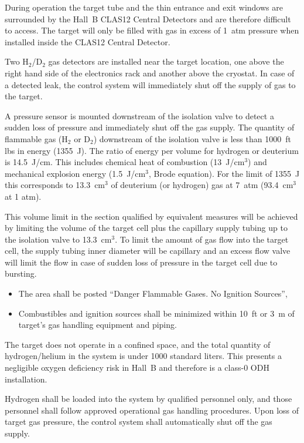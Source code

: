 During operation the target tube and the thin entrance and exit windows are surrounded by the Hall~B CLAS12
Central Detectors and are therefore difficult to access. The target will only be filled with gas in excess
of 1~atm pressure when installed inside the CLAS12 Central Detector.

Two H$_2$/D$_2$ gas detectors are installed near the target location, one above the right hand side of the
electronics rack and another above the cryostat. In case of a detected leak, the control system will
immediately shut off the supply of gas to the target.

A pressure sensor is mounted downstream of the isolation valve to detect a sudden loss of pressure and
immediately shut off the gas supply. The quantity of flammable gas (H$_2$ or D$_2$) downstream of the
isolation valve is less than 1000~ft lbs in energy (1355~J). The ratio of energy per volume for hydrogen
or deuterium is 14.5~J/cm. This includes chemical heat of combustion (13~J/cm$^3$) and mechanical explosion
energy (1.5~J/cm$^3$, Brode equation). For the limit of 1355~J this corresponds to 13.3~cm$^3$ of deuterium
(or hydrogen) gas at 7~atm (93.4~cm$^3$ at 1 atm).

This volume limit in the section qualified by equivalent measures will be achieved by limiting the volume
of the target cell plus the capillary supply tubing up to the isolation valve to 13.3~cm$^3$. To limit the
amount of gas flow into the target cell, the supply tubing inner diameter will be capillary and an excess
flow valve will limit the flow in case of sudden loss of pressure in the target cell due to bursting.

\begin{itemize}
\item The area shall be posted ``Danger Flammable Gases. No Ignition Sources'',
\item Combustibles and ignition sources shall be minimized within 10~ft or 3~m of target’s gas handling
  equipment and piping.
\end{itemize}

The target does not operate in a confined space, and the total quantity of hydrogen/helium in the system is
under 1000 standard liters. This presents a negligible oxygen deficiency risk in Hall~B and therefore is a
class-0 ODH installation.

Hydrogen shall be loaded into the system by qualified personnel only, and those personnel shall follow
approved operational gas handling procedures. Upon loss of target gas pressure, the control system shall
automatically shut off the gas supply.

